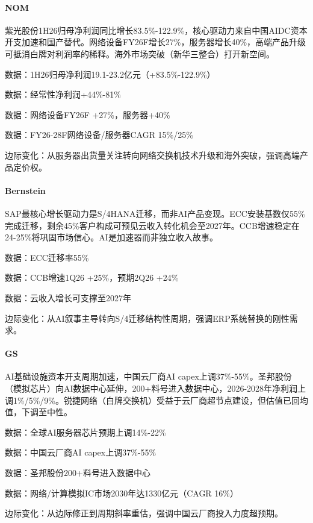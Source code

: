 \documentclass[11pt]{ctexart}
\begin{document}
\paragraph{NOM} 紫光股份1H26归母净利润同比增长83.5\%-122.9\%，核心驱动力来自中国AIDC资本开支加速和国产替代。网络设备FY26F增长27\%，服务器增长40\%，高端产品升级可抵消白牌对利润率的稀释。海外市场突破（新华三整合）打开新空间。
{\small\color{refgray}数据：1H26归母净利润19.1-23.2亿元（+83.5\%-122.9\%）\par}
{\small\color{refgray}数据：经常性净利润+44\%-81\%\par}
{\small\color{refgray}数据：网络设备FY26F +27\%，服务器+40\%\par}
{\small\color{refgray}数据：FY26-28F网络设备/服务器CAGR 15\%/25\%\par}
{\small\color{refgray}边际变化：从服务器出货量关注转向网络交换机技术升级和海外突破，强调高端产品定价权。\par}
\paragraph{Bernstein} SAP最核心增长驱动力是S/4HANA迁移，而非AI产品变现。ECC安装基数仅55\%完成迁移，剩余45\%客户构成可预见云收入转化机会至2027年。CCB增速稳定在24-25\%将巩固市场信心。AI是加速器而非独立收入故事。
{\small\color{refgray}数据：ECC迁移率55\%\par}
{\small\color{refgray}数据：CCB增速1Q26 +25\%，预期2Q26 +24\%\par}
{\small\color{refgray}数据：云收入增长可支撑至2027年\par}
{\small\color{refgray}边际变化：从AI叙事主导转向S/4迁移结构性周期，强调ERP系统替换的刚性需求。\par}
\paragraph{GS} AI基础设施资本开支周期加速，中国云厂商AI capex上调37\%-55\%。圣邦股份（模拟芯片）向AI数据中心延伸，200+料号进入数据中心，2026-2028年净利润上调1\%/5\%/9\%。锐捷网络（白牌交换机）受益于云厂商超节点建设，但估值已回均值，下调至中性。
{\small\color{refgray}数据：全球AI服务器芯片预期上调14\%-22\%\par}
{\small\color{refgray}数据：中国云厂商AI capex上调37\%-55\%\par}
{\small\color{refgray}数据：圣邦股份200+料号进入数据中心\par}
{\small\color{refgray}数据：网络/计算模拟IC市场2030年达1330亿元（CAGR 16\%）\par}
{\small\color{refgray}边际变化：从边际修正到周期斜率重估，强调中国云厂商投入力度超预期。\par}
\end{document}
